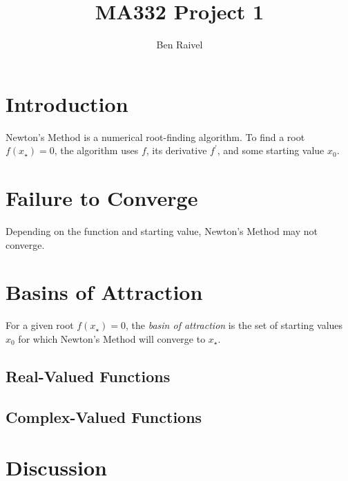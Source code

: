 \documentclass[10pt,a4paper]{article}
\title{MA332 Project 1}
\author{Ben Raivel}
\begin{document}
	\maketitle
	\section{Introduction}
	Newton's Method is a numerical root-finding algorithm. To find a root $ f(x_\star) = 0 $, the algorithm uses $f$, its derivative $f^\prime$, and some starting value $x_0$.

	\section{Failure to Converge}
	Depending on the function and starting value, Newton's Method may not converge.
	
	\section{Basins of Attraction}
	For a given root $ f(x_\star) = 0$, the \emph{basin of attraction} is the set of starting values $ x_0 $ for which Newton's Method will converge to $ x_\star $.
	
		\subsection{Real-Valued Functions}
		
		\subsection{Complex-Valued Functions}
		
	\section{Discussion}
\end{document}

